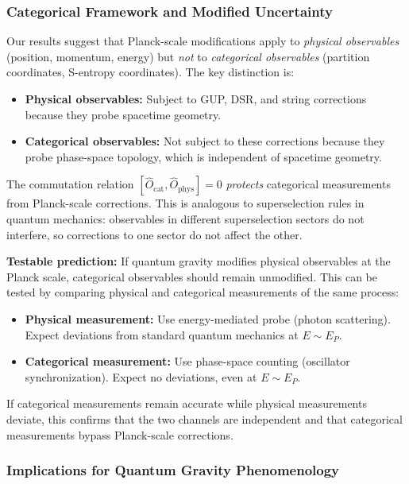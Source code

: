 \documentclass[twocolumn,10pt]{article}
\theoremstyle{remark}
\begin{document}
\subsubsection{Categorical Framework and Modified Uncertainty}

Our results suggest that Planck-scale modifications apply to \textit{physical observables} (position, momentum, energy) but \textit{not} to \textit{categorical observables} (partition coordinates, S-entropy coordinates). The key distinction is:

\begin{itemize}
    \item \textbf{Physical observables:} Subject to GUP, DSR, and string corrections because they probe spacetime geometry.

    \item \textbf{Categorical observables:} Not subject to these corrections because they probe phase-space topology, which is independent of spacetime geometry.
\end{itemize}

The commutation relation $[\hat{O}_{\text{cat}}, \hat{O}_{\text{phys}}] = 0$ \textit{protects} categorical measurements from Planck-scale corrections. This is analogous to superselection rules in quantum mechanics: observables in different superselection sectors do not interfere, so corrections to one sector do not affect the other.

\textbf{Testable prediction:} If quantum gravity modifies physical observables at the Planck scale, categorical observables should remain unmodified. This can be tested by comparing physical and categorical measurements of the same process:
\begin{itemize}
    \item \textbf{Physical measurement:} Use energy-mediated probe (photon scattering). Expect deviations from standard quantum mechanics at $E \sim E_P$.

    \item \textbf{Categorical measurement:} Use phase-space counting (oscillator synchronization). Expect no deviations, even at $E \sim E_P$.
\end{itemize}

If categorical measurements remain accurate while physical measurements deviate, this confirms that the two channels are independent and that categorical measurements bypass Planck-scale corrections.

\subsubsection{Implications for Quantum Gravity Phenomenology}
\end{document}
